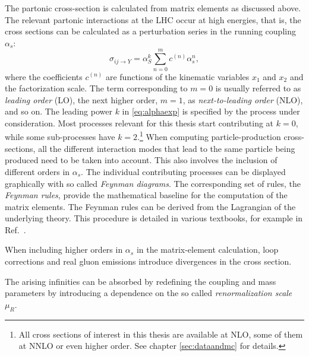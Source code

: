 The partonic cross-section is calculated from matrix elements as discussed above.
The relevant partonic interactions at the LHC occur at high energies, that is, the cross sections can be calculated as a perturbation series in the running coupling $\alpha_s$:
\begin{equation}
  \hat{\sigma}_{ij \rightarrow Y} = \alpha^k_S \sum_{n=0}^{m} c^{(n)}\alpha_s^n,
  \label{eq:alphaexp}
\end{equation}
where the coefficients $c^{(n)}$ are functions of the kinematic variables $x_1$ and $x_2$ and the factorization scale. The term corresponding to $m=0$ is usually referred to as \emph{leading order} (LO), the next higher order, $m=1$, as \emph{next-to-leading order} (NLO), and so on.
The leading power $k$ in \cref{eq:alphaexp} is specified by the process under consideration. Most processes relevant for this thesis start contributing at $k=0$, while some sub-processes have $k=2$.\footnote{All cross sections of interest in this thesis are available at NLO, some of them at NNLO or even higher order. See chapter \cref{sec:dataandmc} for details.}
When computing particle-production cross-sections, all the different interaction modes that lead to the same particle being produced need to be taken into account. This also involves the inclusion of different orders in $\alpha_s$.
The individual contributing processes can be displayed graphically with so called \emph{Feynman diagrams}. The corresponding set of rules, the \emph{Feynman rules}, provide the mathematical baseline for the computation of the matrix elements. The Feynman rules can be derived from the Lagrangian of the underlying theory.
This procedure is detailed in various textbooks, for example in Ref.~\cite{Griffiths:111880}.

When including higher orders in $\alpha_s$ in the matrix-element calculation, loop corrections and real gluon emissions introduce divergences in the cross section. %

The arising infinities can be absorbed by redefining the coupling and mass parameters by introducing a dependence on the so called \emph{renormalization scale} $\mu_R$.

